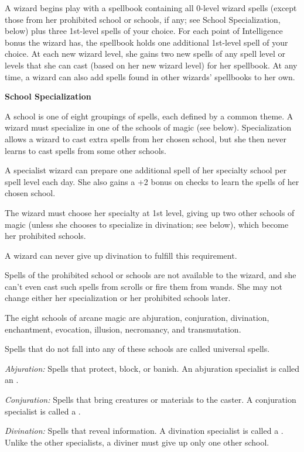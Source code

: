 A wizard begins play with a spellbook containing all 0-level wizard spells (except those from her prohibited school or schools, if any; see School Specialization, below) plus three 1st-level spells of your choice. For each point of Intelligence bonus the wizard has, the spellbook holds one additional 1st-level spell of your choice. At each new wizard level, she gains two new spells of any spell level or levels that she can cast (based on her new wizard level) for her spellbook. At any time, a wizard can also add spells found in other wizards' spellbooks to her own.

\textbf{School Specialization}

A school is one of eight groupings of spells, each defined by a common theme. A wizard must specialize in one of the schools of magic (see below). Specialization allows a wizard to cast extra spells from her chosen school, but she then never learns to cast spells from some other schools.

A specialist wizard can prepare one additional spell of her specialty school per spell level each day. She also gains a +2 bonus on  checks to learn the spells of her chosen school.

The wizard must choose her specialty at 1st level, giving up two other schools of magic (unless she chooses to specialize in divination; see below), which become her prohibited schools.

A wizard can never give up divination to fulfill this requirement.

Spells of the prohibited school or schools are not available to the wizard, and she can't even cast such spells from scrolls or fire them from wands. She may not change either her specialization or her prohibited schools later.

The eight schools of arcane magic are abjuration, conjuration, divination, enchantment, evocation, illusion, necromancy, and transmutation.

Spells that do not fall into any of these schools are called universal spells.

\textit{Abjuration:} Spells that protect, block, or banish. An abjuration specialist is called an .

\textit{Conjuration:} Spells that bring creatures or materials to the caster. A conjuration specialist is called a .

\textit{Divination:} Spells that reveal information. A divination specialist is called a . Unlike the other specialists, a diviner must give up only one other school.

